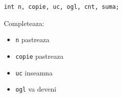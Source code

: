 \begin{examplebox}
\begin{lstlisting}[style=codequest]
int n, copie, uc, ogl, cnt, suma;
\end{lstlisting}
\end{examplebox}

\begin{guidebox}[Roluri]
  Completeaza:
  \begin{itemize}
    \item \texttt{n} pastreaza \hrulefill
    \item \texttt{copie} pastreaza \hrulefill
    \item \texttt{uc} inseamna \hrulefill
    \item \texttt{ogl} va deveni \hrulefill
  \end{itemize}
\end{guidebox}
